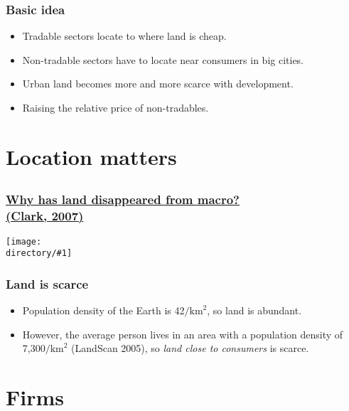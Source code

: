 \documentclass[compress,mathserif]{beamer}
\newcounter{perc}
\newcounter{percek}
\newcommand{\directory}{figures}
\newcommand{\widefigure}[2]{\begin{frame}\frametitle{\hyperlink{#1back}{#2}}\hypertarget{#1}{{\begin{center}\label{#1}\texttt{[image: \\directory/\#1]}\end{center}}}\end{frame}}
\renewcommand{\time}[1]{\addtocounter{percek}{#1}}
\begin{document}
\begin{frame}\frametitle{Basic idea}
\begin{itemize}
    \item Tradable sectors locate to where land is cheap.
    \item Non-tradable sectors have to locate near consumers in big cities.
    \item Urban land becomes more and more scarce with development.
    \item Raising the relative price of non-tradables.
\end{itemize}
\end{frame}
\time{2}



\section{Location matters}
\subsection{}

\widefigure{clark-landrents}{Why has land disappeared from macro?\\ (Clark, 2007)}

\begin{frame}\frametitle{Land is scarce}
\begin{itemize}
    \item Population density of the Earth is 42$/\text{km}^2$, so land is abundant.
    \pause
    \item However, the average person lives in an area with a population density of 7,300$/\text{km}^2$ (LandScan 2005),
    so \emph{land close to consumers} is scarce.
\end{itemize}
\end{frame}
\time 2



\section{Firms}
\subsection{}
\end{document}
